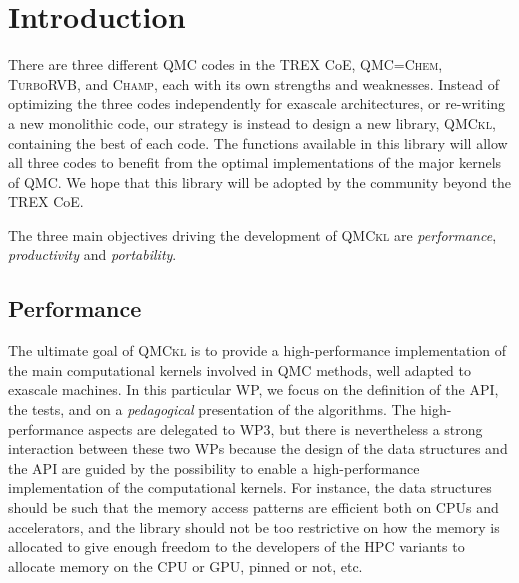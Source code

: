 \newcommand{\orgmode}{\texttt{org-mode}}
\newcommand{\Makefile}{\texttt{Makefile}}
\newcommand{\context}{\texttt{context}}
\newcommand{\CC}{C\nolinebreak\hspace{-.05em}\raisebox{.4ex}{\tiny\bf +}\nolinebreak\hspace{-.10em}\raisebox{.4ex}{\tiny\bf +}}
\def\CC{{C\nolinebreak[4]\hspace{-.05em}\raisebox{.4ex}{\tiny\bf ++}}}
\newcommand{\qmcchem}{\textsc{QMC=Chem}}
\newcommand{\champ}{\textsc{Champ}}
\newcommand{\turbo}{\textsc{TurboRVB}}
\newcommand{\QMCkl}{\textsc{\ac{QMCkl}}}

\section{Introduction}

There are three different \ac{QMC} codes in the \ac{TREX} \ac{CoE},
\qmcchem{}, \turbo{}, and \champ{}, each with its own strengths and
weaknesses. Instead of optimizing the three codes independently for
exascale architectures, or re-writing a new monolithic code, our
strategy is instead to design a new library, \QMCkl{}, containing
the best of each code. The functions available in this library will
allow all three codes to benefit from the optimal implementations of
the major kernels of \ac{QMC}. We hope that this library will be
adopted by the community beyond the \ac{TREX} \ac{CoE}.

The three main objectives driving the development of \QMCkl{} are
\emph{performance}, \emph{productivity} and \emph{portability}.

\subsection{Performance}

The ultimate goal of \QMCkl{} is to provide a high-performance
implementation of the main computational kernels involved in \ac{QMC}
methods, well adapted to exascale machines.
In this particular \ac{WP}, we focus on the
definition of the \ac{API}, the tests, and on a \emph{pedagogical}
presentation of the algorithms. The high-performance aspects are
delegated to \ac{WP}3, but there is nevertheless a strong interaction
between these two \acp{WP} because the design of the data structures
and the \ac{API} are guided by the possibility to enable a
high-performance implementation of the computational kernels.
For instance, the data structures should be such that the memory
access patterns are efficient both on CPUs and accelerators, and the
library should not be too restrictive on how the memory is allocated
to give enough freedom to the developers of the \ac{HPC} variants to
allocate memory on the CPU or \ac{GPU}, pinned or not, etc.

